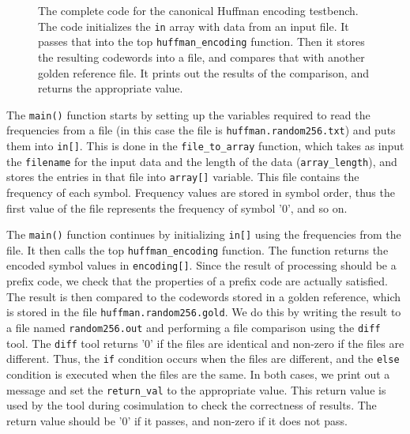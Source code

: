 \begin{figure}
\begin{tiny}

\end{tiny}
\end{figure}
\begin{figure}
\begin{tiny}

\end{tiny}
\caption{ The complete code for the canonical Huffman encoding testbench. The code initializes the \lstinline{in} array with data from an input file. It passes that into the top \lstinline{huffman_encoding} function. Then it stores the resulting codewords into a file, and compares that with another golden reference file. It prints out the results of the comparison, and returns the appropriate value.}
\label{fig:huffman_encoding_test.cpp}
\end{figure}

The \lstinline{main()} function starts by setting up the variables required to read the frequencies from a file (in this case the file is \texttt{huffman.random256.txt}) and puts them into \lstinline{in[]}. This is done in the \lstinline{file_to_array} function, which takes as input the \lstinline{filename} for the input data and the length of the data (\lstinline{array_length}), and stores the entries in that file into \lstinline{array[]} variable. This file contains the frequency of each symbol. Frequency values are stored in symbol order, thus the first value of the file represents the frequency of symbol '0', and so on. 

The \lstinline{main()} function continues by initializing \lstinline{in[]} using the frequencies from the file. It then calls the top \lstinline{huffman_encoding} function. The function returns the encoded symbol values in \lstinline{encoding[]}. Since the result of processing should be a prefix code, we check that the properties of a prefix code are actually satisfied.  The result is then compared to the codewords stored in a golden reference, which is stored in the file \texttt{huffman.random256.gold}. We do this by writing the result to a file named \texttt{random256.out} and performing a file comparison using the \texttt{diff} tool. The \texttt{diff} tool returns '0' if the files are identical and non-zero if the files are different. Thus, the \lstinline{if} condition occurs when the files are different, and the \lstinline{else} condition is executed when the files are the same. In both cases, we print out a message and set the \lstinline{return_val} to the appropriate value. This return value is used by the \VHLS tool during cosimulation to check the correctness of results.  The return value should be '0' if it passes, and non-zero if it does not pass.

